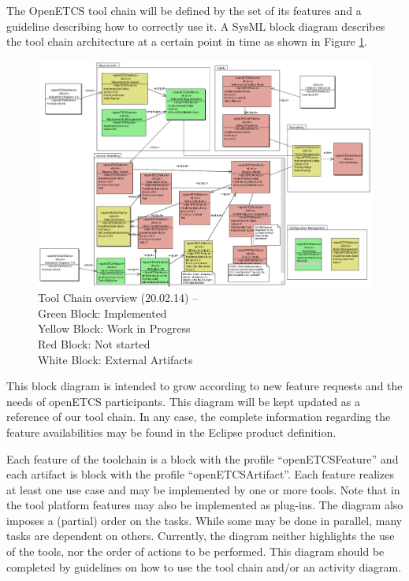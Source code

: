 The OpenETCS tool chain  will be defined by the set of its features and
a guideline describing how to correctly use it.
A SysML block diagram describes the tool chain architecture at a certain point in time as shown in
Figure \ref{fig:overview}. 
\begin{figure}[htbp]
\includegraphics[width=\textwidth]{ToolChainmodel}
\caption{\label{fig:overview} Tool Chain overview (20.02.14) -- \\
  Green Block: Implemented \\
  Yellow Block: Work in Progress \\
  Red Block: Not started \\
  White Block: External Artifacts} 
\end{figure}

This block diagram is intended to grow according to new feature requests and the
needs of openETCS participants.  This diagram will be kept updated
as a reference of our tool chain. In any case, the complete information
regarding the feature availabilities  may be found in the Eclipse product
definition.

Each feature of the toolchain is a block with the profile ``openETCSFeature''
and  each artifact is block with the profile ``openETCSArtifact''.  Each
feature realizes at least one use case and may be implemented by one or more tools.
Note that in the tool platform features  may also be
implemented as plug-ins. The diagram also imposes a (partial) order
on the tasks. While some may be done in parallel, many tasks are dependent on others.
Currently, the diagram neither highlights the use of the tools, nor the order of actions
to be performed. This diagram should be completed by guidelines on
how to use the tool chain and/or an activity diagram.

